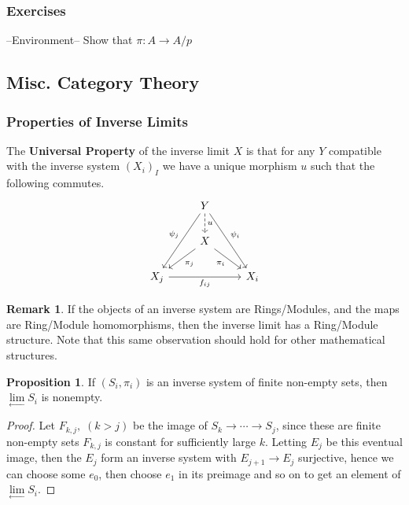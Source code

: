 \documentclass[11pt]{article}
\theoremstyle{definition}
\newtheorem{prop}{Proposition}
\newtheorem*{rmk}{Remark}
\begin{document}
    \subsubsection{Exercises}

    --Environment-- Show that \(\pi: A \to A/p\)

    \subsection{Misc. Category Theory}
    \subsubsection{Properties of Inverse Limits}
    The \textbf{Universal Property} of the inverse limit \(X\) is that for any \(Y\) compatible with the inverse system \((X_i)_I\) we have a unique morphism \(u\) such that the following commutes.
    \begin{equation*}\label{invuniv}
        \begin{tikzcd}
            & Y \arrow[ldd, "\psi_j"'] \arrow[d, "u",dashed] \arrow[rdd, "\psi_i"] &     \\
            & X \arrow[ld, "\pi_j"] \arrow[rd, "\pi_i"']                    &     \\
            X_j \arrow[rr, "f_{ij}"'] &                                                               & X_i
        \end{tikzcd}
    \end{equation*}
    \begin{rmk}
        If the objects of an inverse system are Rings/Modules, and the maps are Ring/Module homomorphisms, then the inverse limit has a Ring/Module structure. Note that this same observation should hold for other mathematical structures.
    \end{rmk}
    \begin{prop}\label{nonemptyinvlimit}
        If \((S_i,\pi_i)\) is an inverse system of finite non-empty sets, then \(\lim\limits_{\longleftarrow}S_i\) is nonempty.
        \begin{proof}
            Let \(F_{k,j},\; (k > j)\) be the image of \(S_k\to \cdots\to S_j\), since these are finite non-empty sets \(F_{k,j}\) is constant for sufficiently large \(k\). Letting \(E_j\) be this eventual image, then the \(E_j\) form an inverse system with \(E_{j+1} \to E_j\) surjective, hence we can choose some \(e_0\), then choose \(e_1\) in its preimage and so on to get an element of \(\lim\limits_{\longleftarrow}S_i\).
        \end{proof}
    \end{prop}
\end{document}
